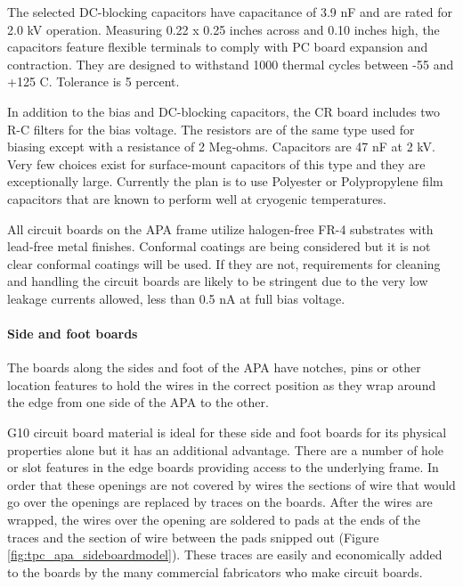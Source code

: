 The selected DC-blocking capacitors have capacitance of 3.9 nF and are rated for 2.0 kV operation. Measuring 0.22 x 0.25 inches across and 0.10 inches high, the capacitors feature flexible terminals to comply with PC board expansion and contraction. They are designed to withstand 1000 thermal cycles between -55 and +125 C. Tolerance is 5 percent.

In addition to the bias and DC-blocking capacitors, the CR board includes two R-C filters for the bias voltage. The resistors are of the same type used for biasing except with a resistance of 2 Meg-ohms. Capacitors are 47 nF at 2 kV. Very few choices exist for surface-mount capacitors of this type and they are exceptionally large. Currently the plan is to use Polyester or Polypropylene film capacitors that are known to perform well at cryogenic temperatures.

All circuit boards on the APA frame utilize halogen-free FR-4 substrates with lead-free metal finishes. Conformal coatings are being considered but it is not clear conformal coatings will be used. If they are not, requirements for cleaning and handling the circuit boards are likely to be stringent due to the very low leakage currents allowed, less than 0.5 nA at full bias voltage.

\paragraph{Side and foot boards}

The boards along the sides and foot of the APA have notches, pins or other location features to hold the wires in the correct position as they wrap around the edge from one side of the APA to the other.

G10 circuit board material is ideal for these side and foot boards for its physical properties alone but it has an additional advantage.  There are a number of hole or slot features in the edge boards providing access to the underlying frame.  In order that these openings are not covered by wires the sections of wire that would go over the openings are replaced by traces on the boards.  After the wires are wrapped, the wires over the opening are soldered to pads at the ends of the traces and the section of wire between the pads snipped out (Figure \ref{fig:tpc_apa_sideboardmodel}).  These traces are easily and economically added to the boards by the many commercial fabricators who make circuit boards. 

